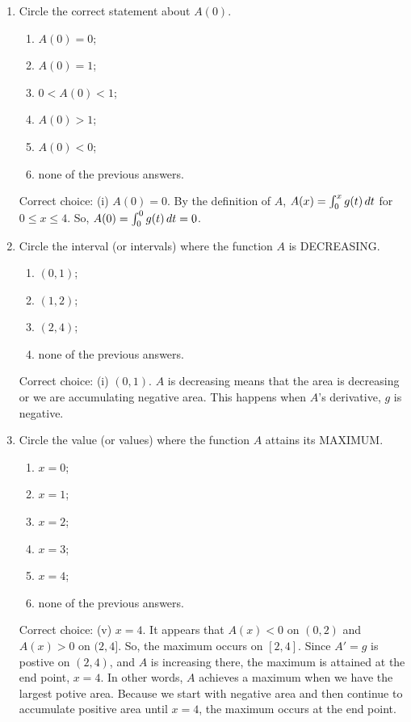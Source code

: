 \documentclass{ximera}
\begin{document}
\begin{problem}
\begin{enumerate}
    \item
      Circle the correct statement about $A(0)$.
      \begin{enumerate}
        \item $A(0) = 0$;
        \item $A(0) = 1$;
        \item $0 < A(0) < 1$;
        \item $A(0) > 1$;
        \item $A(0) < 0$;
        \item none of the previous answers.
      \end{enumerate}
      \begin{explanation}
        Correct choice: (i) $A(0) = 0$.  By the definition of $A$, $A(x)=\int_0^x g(t) \,d t$ for $0 \le x \le 4$. So, $A(0)=\int_0^0 g(t) \,d t=0$.  
      \end{explanation}
    \item
      Circle the interval (or intervals) where the function $A$ is DECREASING.
      \begin{enumerate}
        \item $(0, 1)$;
        \item $(1, 2)$;
        \item $(2, 4)$;
        \item none of the previous answers.
      \end{enumerate}
      \begin{explanation}
        Correct choice: (i) $(0, 1)$.  $A$ is decreasing means that the area is decreasing or we are accumulating negative area.  This happens when $A$'s derivative, $g$ is negative.
      \end{explanation}
    \item
      Circle the value (or values) where the function $A$ attains its MAXIMUM.
      \begin{enumerate}
        \item $x = 0$;
        \item $x = 1$;
        \item $x = 2$;
        \item $x = 3$;
        \item $x = 4$;
        \item none of the previous answers.
      \end{enumerate}
      \begin{explanation}
        Correct choice: (v) $x = 4$.  It appears that $A(x)<0$ on $(0,2)$ and $A(x)>0$ on $(2,4]$.  So, the maximum occurs on $[2,4]$.  Since $A'=g$ is postive on $(2,4)$, and $A$ is increasing there, the maximum is attained at the end point, $x=4$.  In other words, $A$ achieves a maximum when we have the largest potive area.  Because we start with negative area and then continue to accumulate positive area until $x=4$, the maximum occurs at the end point.

\end{explanation}
\end{enumerate}
\end{problem}
\end{document}
